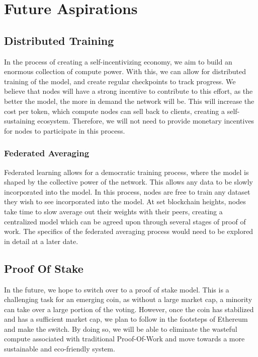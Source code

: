 \documentclass{article}
\begin{document}
\section {Future Aspirations}
\subsection{Distributed Training}
In the process of creating a self-incentivizing economy, we aim to build an enormous collection of compute power. 
With this, we can allow for distributed training of the model, and create regular checkpoints to track progress. 
We believe that nodes will have a strong incentive to contribute to this effort, as the better the model, the more in demand the network will be. 
This will increase the cost per token, which compute nodes can sell back to clients, creating a self-sustaining ecosystem. 
Therefore, we will not need to provide monetary incentives for nodes to participate in this process.

\subsubsection {Federated Averaging}
Federated learning allows for a democratic training process, where the model is shaped by the collective power of the network. 
This allows any data to be slowly incorporated into the model. 
In this process, nodes are free to train any dataset they wish to see incorporated into the model. At set blockchain heights, nodes take time to slow average out their weights with their peers, creating a centralized model which can be agreed upon through several stages of proof of work. 
The specifics of the federated averaging process would need to be explored in detail at a later date.

\subsection{Proof Of Stake}

In the future, we hope to switch over to a proof of stake model. 
This is a challenging task for an emerging coin, as without a large market cap, a minority can take over a large portion of the voting. 
However, once the coin has stabilized and has a sufficient market cap, we plan to follow in the footsteps of Ethereum and make the switch. 
By doing so, we will be able to eliminate the wasteful compute associated with traditional Proof-Of-Work and move towards a more sustainable and eco-friendly system.
\end{document}
